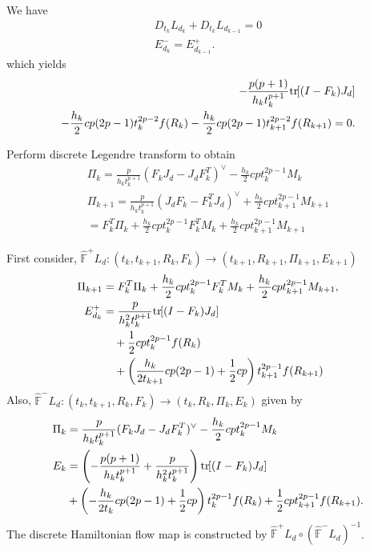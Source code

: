 \documentclass[letterpaper, 10pt, conference]{ieeeconf}
\newcommand{\bracket}[1]{\ensuremath{\left[ #1 \right]}}
\newcommand{\parenth}[1]{\ensuremath{\left( #1 \right)}}
\newcommand{\tr}[1]{\mbox{tr}\ensuremath{\negthickspace\bracket{#1}}}
\begin{document}
We have
\begin{align*}
    D_{t_k} L_{d_k} + D_{t_k} L_{d_{k-1}} = 0\\
    E^-_{d_k} = E^+_{d_{k-1}}.
\end{align*}
which yields
\begin{align*}
-\frac{p(p+1)}{h_k t_k^{p+1}} \tr{(I-F_k)J_d} \\
    - \frac{h_k}{2}cp(2p-1) t_k^{2p-2} f(R_k)  
 - \frac{h_k}{2}cp(2p-1) t_{k+1}^{2p-2} f(R_{k+1})  =0.
\end{align*}

Perform discrete Legendre transform to obtain
\begin{gather*}
\Pi_k =\frac{p}{h_k t_k^{p+1}} (F_k J_d - J_dF_k^T)^\vee  -\frac{h_k}{2} cp t_k^{2p-1} M_k \\
\Pi_{k+1} = \frac{p}{h_k t_k^{p+1}} (J_dF_k -F_k^T J_d)^\vee + \frac{h_k}{2} cpt^{2p-1}_{k+1} M_{k+1}\\
= F_k^T \Pi_k + \frac{h_k}{2} cp t_k^{2p-1} F_k^T M_k +\frac{h_k}{2} cpt^{2p-1}_{k+1} M_{k+1}
\end{gather*}

First consider, $\hat{\mathbb{F}}^+ L_d: (t_k,t_{k+1},R_k,F_k)\rightarrow(t_{k+1}, R_{k+1}, \Pi_{k+1}, E_{k+1})$
\begin{align*}
    \Pi_{k+1} & = F_k^T \Pi_k + \frac{h_k}{2} cp t_k^{2p-1} F_k^T M_k +\frac{h_k}{2} cpt^{2p-1}_{k+1} M_{k+1},\\
    E^+_{d_k} & = \frac{p}{h_k^2 t_k^{p+1}} \tr{(I-F_k)J_d} \\
              & \quad + \frac{1}{2}c p t_k^{2p-1} f(R_k) \\
              & \quad + \parenth{\frac{h_k}{2t_{k+1}}cp(2p-1)  + \frac{1}{2}c p}       t_{k+1}^{2p-1}  f(R_{k+1})
\end{align*}
Also, $\hat{\mathbb{F}}^- L_d: (t_k,t_{k+1}, R_k, F_k)\rightarrow (t_k, R_k, \Pi_k, E_k)$ given by
\begin{align*}
    \Pi_k & =\frac{p}{h_k t_k^{p+1}} (F_k J_d - J_dF_k^T)^\vee  -\frac{h_k}{2} cp t_k^{2p-1} M_k \\
    E_k  
          & = \parenth{-\frac{p(p+1)}{h_k t_k^{p+1}} + \frac{p}{h_k^2 t_k^{p+1}}} \tr{(I-F_k)J_d} \\
          & + \parenth{- \frac{h_k}{2 t_k}cp(2p-1) 
          + \frac{1}{2}c p} t_k^{2p-1} f(R_k) + \frac{1}{2}c p t_{k+1}^{2p-1} f(R_{k+1}).
\end{align*}
The discrete Hamiltonian flow map is constructed by $\hat{\mathbb{F}}^+L_d \circ (\hat{\mathbb{F}}^-L_d)^{-1}$.



\end{document}
